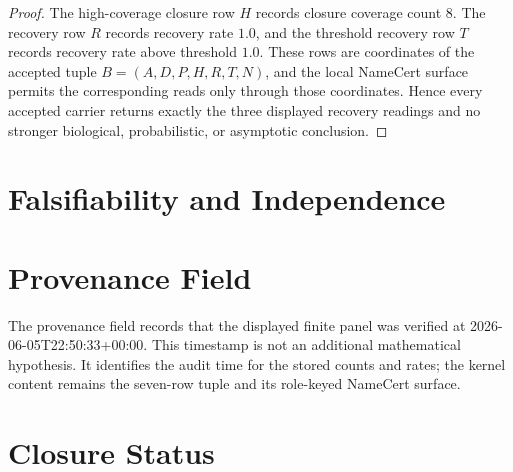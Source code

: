 \begin{proof}
The high-coverage closure row $H$ records closure coverage count $8$. The recovery row $R$ records recovery rate $1.0$, and the threshold recovery row $T$ records recovery rate above threshold $1.0$. These rows are coordinates of the accepted tuple $B=(A,D,P,H,R,T,N)$, and the local NameCert surface permits the corresponding reads only through those coordinates. Hence every accepted carrier returns exactly the three displayed recovery readings and no stronger biological, probabilistic, or asymptotic conclusion.
\end{proof}

\section{Falsifiability and Independence}
\label{sec:bioreality-q-six-leave-one-codon-boundary-falsifiability}



\section{Provenance Field}
\label{sec:bioreality-q-six-leave-one-codon-boundary-provenance}

The provenance field records that the displayed finite panel was verified at 2026-06-05T22:50:33+00:00. This timestamp is not an additional mathematical hypothesis. It identifies the audit time for the stored counts and rates; the kernel content remains the seven-row tuple and its role-keyed NameCert surface.

\section{Closure Status}
\label{sec:bioreality-q-six-leave-one-codon-boundary-closure-status}

